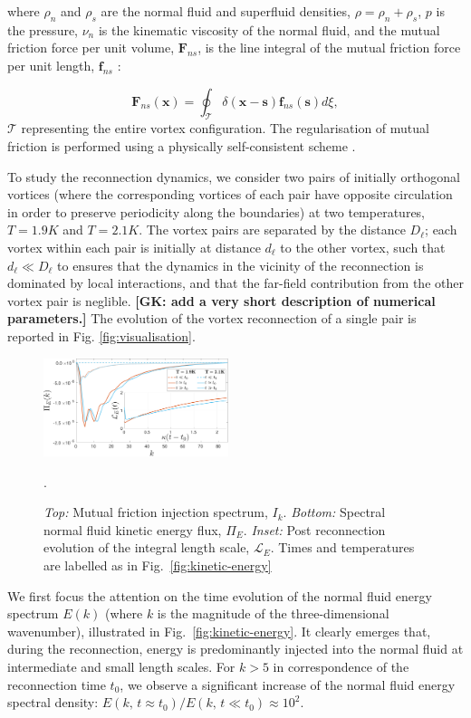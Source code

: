 \documentclass[%
 reprint,
 amsmath,amssymb,
 aps,
 prl,
]{revtex4-2}
\def \s{\mathbf{s}}
\def \x{\mathbf{x}}
\newcommand*{\NOTE}[1]{\textbf{\color{red}[#1]}}
\begin{document}
{\noindent
where 
$\rho_n$ and $\rho_s$ are the normal fluid and superfluid densities,
$\rho=\rho_n + \rho_s$,  $p$ is the pressure,  $\nu_n$ is the kinematic 
viscosity of the normal fluid, and the mutual friction force per unit
volume, $\mathbf{F}_{ns}$, is the line integral of the mutual friction 
force per unit length, $\mathbf{f}_{ns}$ \cite{suppMat}:

\begin{equation}
\mathbf{F}_{ns}(\x) = 
\oint_{\mathcal{T}}\delta(\x-\s)\mathbf{f}_{ns}(\s)d\xi,     
\end{equation}
$\mathcal{T}$ representing the entire vortex configuration. 
The regularisation of mutual friction is performed using a physically self-consistent scheme \cite{galantucciNewSelfconsistentApproach2020b, gualtieri2015exact, gualtieri2017turbulence}.

To study the reconnection dynamics, we consider
two pairs of initially orthogonal vortices 
(where the corresponding vortices of each pair have opposite circulation 
in order to preserve periodicity along the boundaries)
at two temperatures, $T=1.9K$ and $T=2.1K$. The vortex pairs are 
separated by the distance $D_{\ell}$; each vortex within each pair is 
initially at distance $d_{\ell}$ to the other vortex, 
such that $d_{\ell}\ll D_{\ell}$ to ensures that the dynamics 
in the vicinity of the reconnection is dominated by local interactions, 
and that the far-field contribution from the other vortex pair is
neglible. \NOTE{GK: add a very short description of numerical parameters.} The evolution of the vortex reconnection of a single pair is reported in Fig. \ref{fig:visualisation}. 
\begin{figure}[t]
    \centering
    \includegraphics*[width=0.48\textwidth]{flux-spec.pdf}
\caption{\emph{Top:} Mutual friction injection spectrum, $I_k$. 
\emph{Bottom:} Spectral normal fluid kinetic energy flux, $\Pi_E$. 
\emph{Inset:} Post reconnection evolution of the integral length scale, $\mathcal{L}_E$.
Times and temperatures are labelled as in Fig.~\ref{fig:kinetic-energy}}.
\label{fig:energy-flux}
\end{figure}

We first focus the attention on the time evolution of the normal fluid energy spectrum $E(k)$ (where $k$ is the magnitude of the three-dimensional wavenumber), illustrated in Fig.~\ref{fig:kinetic-energy}. It clearly emerges that, during the reconnection, energy is predominantly injected into the normal fluid at intermediate and small length scales. 
For $k>5$ in correspondence of the reconnection time $t_0$,
we observe a significant increase of the normal fluid energy spectral density:
$E(k,\, t\approx t_0)/E(k,\, t\ll t_0) \approx 10^2$. 

}
\end{document}
